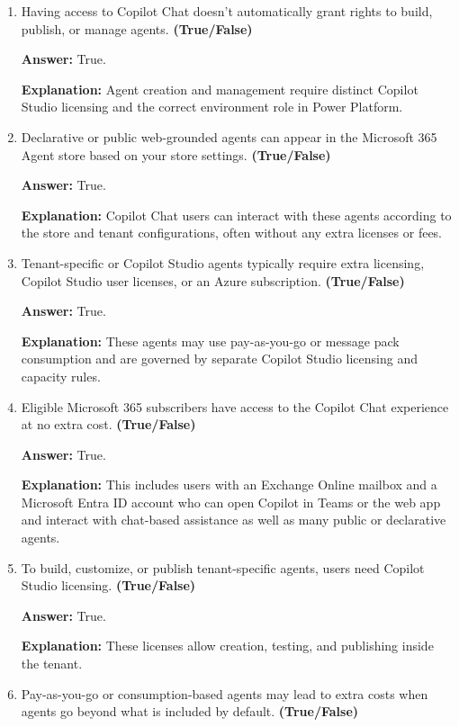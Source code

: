 \documentclass[10pt]{article}
\begin{document}
\begin{enumerate}[leftmargin=*]

\item Having access to Copilot Chat doesn’t automatically grant rights to build, publish, or manage agents. \textbf{(True/False)}

\textbf{Answer:} True.

\textbf{Explanation:} Agent creation and management require distinct Copilot Studio licensing and the correct environment role in Power Platform.

\item Declarative or public web-grounded agents can appear in the Microsoft 365 Agent store based on your store settings. \textbf{(True/False)}

\textbf{Answer:} True.

\textbf{Explanation:} Copilot Chat users can interact with these agents according to the store and tenant configurations, often without any extra licenses or fees.

\item Tenant-specific or Copilot Studio agents typically require extra licensing, Copilot Studio user licenses, or an Azure subscription. \textbf{(True/False)}

\textbf{Answer:} True.

\textbf{Explanation:} These agents may use pay-as-you-go or message pack consumption and are governed by separate Copilot Studio licensing and capacity rules.

\item Eligible Microsoft 365 subscribers have access to the Copilot Chat experience at no extra cost. \textbf{(True/False)}

\textbf{Answer:} True.

\textbf{Explanation:} This includes users with an Exchange Online mailbox and a Microsoft Entra ID account who can open Copilot in Teams or the web app and interact with chat-based assistance as well as many public or declarative agents.

\item To build, customize, or publish tenant-specific agents, users need Copilot Studio licensing. \textbf{(True/False)}

\textbf{Answer:} True.

\textbf{Explanation:} These licenses allow creation, testing, and publishing inside the tenant.

\item Pay-as-you-go or consumption-based agents may lead to extra costs when agents go beyond what is included by default. \textbf{(True/False)}


\end{enumerate}
\end{document}
